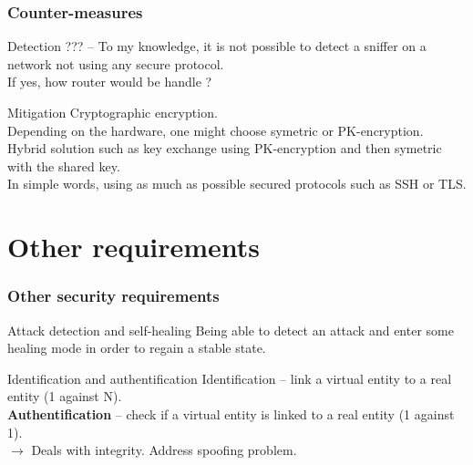 \documentclass{beamer}
\begin{document}
\begin{frame}
    \frametitle{Counter-measures}

    \begin{block}{Detection}
        ??? -- To my knowledge, it is not possible to detect a sniffer on a network not using any secure protocol.\\
        If yes, how router would be handle ?
    \end{block}
    \vfill
    \begin{block}{Mitigation}
        Cryptographic encryption.\\
        \medskip
        Depending on the hardware, one might choose symetric or PK-encryption.\\
        Hybrid solution such as key exchange using PK-encryption and then symetric with the shared key.\\
        In simple words, using as much as possible secured protocols such as SSH or TLS.
    \end{block}
\end{frame}

\section{Other requirements}

\begin{frame}
    \tableofcontents[currentsection]
\end{frame}

\begin{frame}
    \frametitle{Other security requirements}

    \begin{block}{Attack detection and self-healing}
        Being able to detect an attack and enter some healing mode in order to regain a stable state.
    \end{block}
    \vfill
    \begin{block}{Identification and authentification}
        Identification -- link a virtual entity to a real entity (1 against N).\\
        \medskip
        {\bf Authentification} -- check if a virtual entity is linked to a real entity (1 against 1).\\$\rightarrow$ Deals with integrity. Address spoofing problem.\\
    \end{block}
\end{frame}
\end{document}
